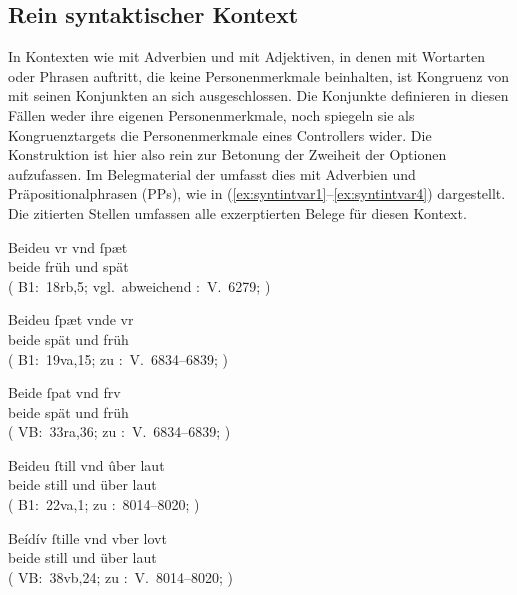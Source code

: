 \subsection{Rein syntaktischer Kontext}
\label{subsec:kcbeidquantsyncont}

In Kontexten wie  mit Adverbien und
 mit Adjektiven, in denen  mit Wortarten oder Phrasen auftritt, die keine
Personenmerkmale beinhalten, ist Kongruenz von 
mit seinen Konjunkten an sich ausgeschlossen. Die Konjunkte definieren in
diesen Fällen weder ihre eigenen Personen\-merkmale, noch spiegeln sie als
Kongruenztargets die Personenmerkmale eines Controllers\is{Controller} wider.
Die Konstruktion ist hier also rein zur Betonung der Zweiheit der Optionen
aufzufassen. Im Belegmaterial der \KC{} umfasst dies 
mit Adverbien und Präpositionalphrasen\is{Präpositionalphrase} (PPs), wie in
(\ref{ex:syntintvar1}--\ref{ex:syntintvar4}) dargestellt. Die zitierten Stellen
umfassen alle exzerptierten Belege für diesen Kontext.

\begin{exe}
\ex \label{ex:syntintvar1}
	\begin{xlist}
	\ex \gll Beideu vr vnd ſpæt \\
		beide früh und spät \\
		\trans {}
		(%
			B1:~18rb,5; vgl.~abweichend
			\KC:~V.~6279;
			\cite[196]{schroeder1895}%
		)

	\ex \gll Beideu ſpæt vnde vr \\
		beide spät und früh \\
		\trans {}
		(%
			B1:~19va,15; zu
			\KC:~V.~6834--6839;
			\cite[206]{schroeder1895}%
		)

	\ex \label{ex:syntintvar1_3}
	\gll Beide ſpat vnd frv \\
		beide spät und früh \\
		\trans {}
			(%
				VB:~33ra,36; zu
				\KC:~V.~6834--6839;
				\cite[206]{schroeder1895}%
			)
\end{xlist}

\ex \label{ex:syntintvar3}
	\begin{xlist}
	\ex \gll Beideu ſtill vnd ûber laut \\
		beide still und über laut \\
		\trans {}
			(%
				B1:~22va,1; zu
				\KC:~8014--8020;
				\cite[228]{schroeder1895}%
			)

	\ex \label{ex:syntintvar3_2}
		\gll Beídív ſtille vnd vber lovt \\
		beide still und über laut \\
		\trans {}
			(%
				VB:~38vb,24; zu
				\KC:~V.~8014--8020;
				\cite[228]{schroeder1895}%
			)
\end{xlist}
\end{exe}

